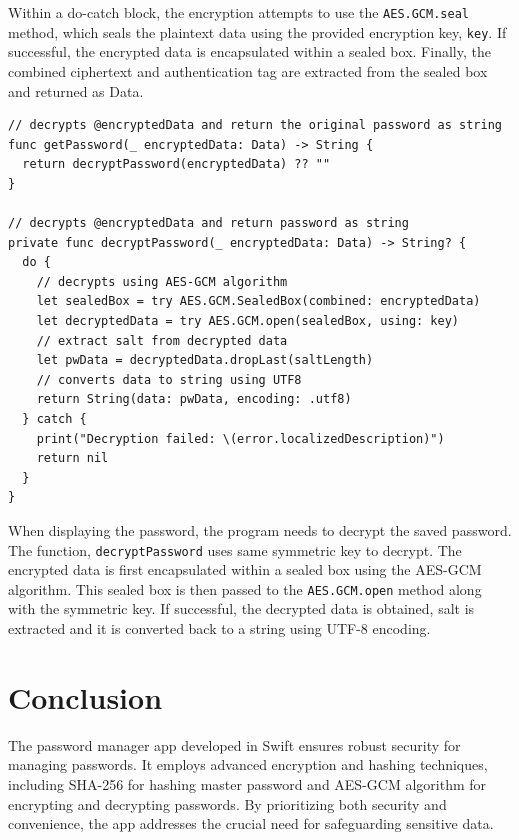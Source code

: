 \documentclass[10pt, titlepage]{article}
\begin{document}
Within a do-catch block, the encryption attempts to use the \texttt{AES.GCM.seal} method, which seals the plaintext data using the provided encryption key, \texttt{key}. If successful, the encrypted data is encapsulated within a sealed box. Finally, the combined ciphertext and authentication tag are extracted from the sealed box and returned as Data.

\begin{center}
\begin{minipage}{\linewidth}
\begin{lstlisting}
// decrypts @encryptedData and return the original password as string
func getPassword(_ encryptedData: Data) -> String {
  return decryptPassword(encryptedData) ?? ""
}

// decrypts @encryptedData and return password as string
private func decryptPassword(_ encryptedData: Data) -> String? {
  do {
    // decrypts using AES-GCM algorithm
    let sealedBox = try AES.GCM.SealedBox(combined: encryptedData)
    let decryptedData = try AES.GCM.open(sealedBox, using: key)
    // extract salt from decrypted data
    let pwData = decryptedData.dropLast(saltLength)
    // converts data to string using UTF8
    return String(data: pwData, encoding: .utf8)
  } catch {
    print("Decryption failed: \(error.localizedDescription)")
    return nil
  }
}
\end{lstlisting}
\end{minipage}
\end{center}
When displaying the password, the program needs to decrypt the saved password. The function, \texttt{decryptPassword} uses same symmetric key to decrypt. The encrypted data is first encapsulated within a sealed box using the AES-GCM algorithm. This sealed box is then passed to the \texttt{AES.GCM.open} method along with the symmetric key. If successful, the decrypted data is obtained, salt is extracted and it is converted back to a string using UTF-8 encoding.

\section*{Conclusion}
The password manager app developed in Swift ensures robust security for managing passwords. It employs advanced encryption and hashing techniques, including SHA-256 for hashing master password and AES-GCM algorithm for encrypting and decrypting passwords. By prioritizing both security and convenience, the app addresses the crucial need for safeguarding sensitive data.

\newpage


\end{document}
